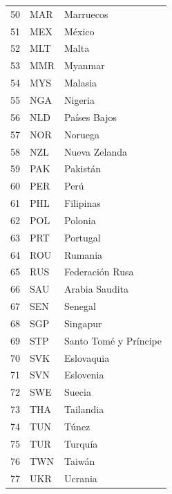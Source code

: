 \begin{longtable}{lll}
	50 & MAR    & Marruecos                            \\
	51 & MEX    & México                               \\
	52 & MLT    & Malta                                \\
	53 & MMR    & Myanmar                              \\
	54 & MYS    & Malasia                              \\
	55 & NGA    & Nigeria                              \\
	56 & NLD    & Países Bajos                         \\
	57 & NOR    & Noruega                              \\
	58 & NZL    & Nueva Zelanda                        \\
	59 & PAK    & Pakistán                             \\
	60 & PER    & Perú                                 \\
	61 & PHL    & Filipinas                            \\
	62 & POL    & Polonia                              \\
	63 & PRT    & Portugal                             \\
	64 & ROU    & Rumania                              \\
	65 & RUS    & Federación Rusa                      \\
	66 & SAU    & Arabia Saudita                       \\
	67 & SEN    & Senegal                              \\
	68 & SGP    & Singapur                             \\
	69 & STP    & Santo Tomé y Príncipe                \\
	70 & SVK    & Eslovaquia                           \\
	71 & SVN    & Eslovenia                            \\
	72 & SWE    & Suecia                               \\
	73 & THA    & Tailandia                            \\
	74 & TUN    & Túnez                                \\
	75 & TUR    & Turquía                              \\
	76 & TWN    & Taiwán                               \\
	77 & UKR    & Ucrania                              \\

\end{longtable}

